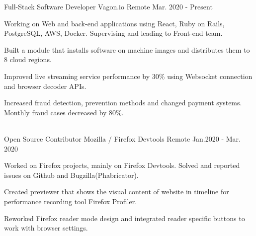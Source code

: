 
\begin{cventries}
  \cvopenentry
   {Full-Stack Software Developer
   } %
    {Vagon.io} %
    {Remote} %
    {Mar. 2020 - Present} %
    {
      \begin{cvitems} %
        \item {Working on Web and back-end applications using React, Ruby on Rails, PostgreSQL, AWS, Docker. Supervising and leading to Front-end team.}
        \item {Built a module that installs software on machine images and distributes them to 8 cloud regions.}
		\item {Improved live streaming service performance by 30\% using Websocket connection and browser decoder APIs.}
		\item {Increased fraud detection, prevention methods and changed payment systems. Monthly fraud cases decreased by 80\%.}
      \end{cvitems}
    }
\\
  \cvopenentry
   {Open Source Contributor} %
    {Mozilla / Firefox Devtools} %
    {Remote} %
    {Jan.2020 - Mar. 2020} %
    {
      \begin{cvitems} %
        \item {Worked on Firefox projects, mainly on Firefox Devtools. Solved and reported issues on Github and Bugzilla(Phabricator).}
        \item {Created previewer that shows the visual content of website in timeline for performance recording tool Firefox Profiler.
        \item {Reworked Firefox reader mode design and integrated reader specific buttons to work with browser settings.}
}
      \end{cvitems}
    }

\end{cventries}
